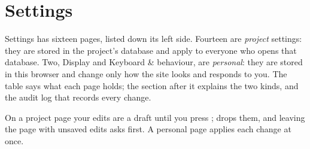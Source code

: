 \chapter{Settings}\label{ch:settings}
Settings has sixteen pages, listed down its left side. Fourteen are \emph{project} settings: they are
stored in the project's database and apply to everyone who opens that database. Two, Display and
Keyboard \& behaviour, are \emph{personal}: they are stored in this browser and change only how the
site looks and responds to you. The table says what each page holds; the section after it explains
the two kinds, and the audit log that records every change.

On a project page your edits are a draft until you press ;  drops them, and
leaving the page with unsaved edits asks first. A personal page applies each change at once.

